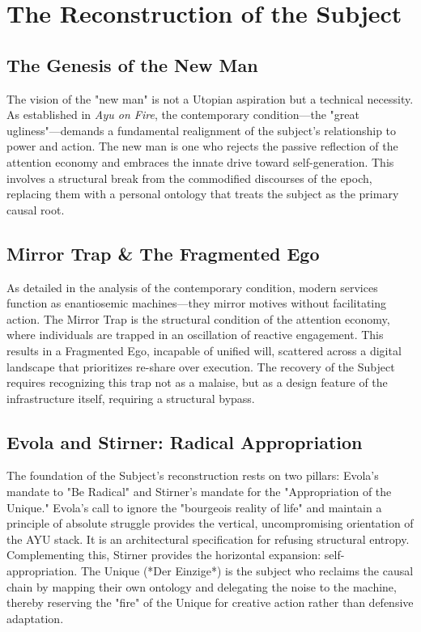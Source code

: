 \documentclass[12pt,a4paper]{report}
\begin{document}
\chapter{The Reconstruction of the Subject}

\section{The Genesis of the New Man}
The vision of the "new man" is not a Utopian aspiration but a technical necessity. As established in \textit{Ayu on Fire}, the contemporary condition—the "great ugliness"—demands a fundamental realignment of the subject's relationship to power and action. The new man is one who rejects the passive reflection of the attention economy and embraces the innate drive toward self-generation. This involves a structural break from the commodified discourses of the epoch, replacing them with a personal ontology that treats the subject as the primary causal root.

\section{Mirror Trap \& The Fragmented Ego}
As detailed in the analysis of the contemporary condition, modern services function as enantiosemic machines—they mirror motives without facilitating action. The Mirror Trap is the structural condition of the attention economy, where individuals are trapped in an oscillation of reactive engagement. This results in a Fragmented Ego, incapable of unified will, scattered across a digital landscape that prioritizes re-share over execution. The recovery of the Subject requires recognizing this trap not as a malaise, but as a design feature of the infrastructure itself, requiring a structural bypass.

\section{Evola and Stirner: Radical Appropriation}
The foundation of the Subject's reconstruction rests on two pillars: Evola's mandate to "Be Radical" and Stirner's mandate for the "Appropriation of the Unique." Evola’s call to ignore the "bourgeois reality of life" and maintain a principle of absolute struggle provides the vertical, uncompromising orientation of the AYU stack. It is an architectural specification for refusing structural entropy. Complementing this, Stirner provides the horizontal expansion: self-appropriation. The Unique (*Der Einzige*) is the subject who reclaims the causal chain by mapping their own ontology and delegating the noise to the machine, thereby reserving the "fire" of the Unique for creative action rather than defensive adaptation.
\end{document}
